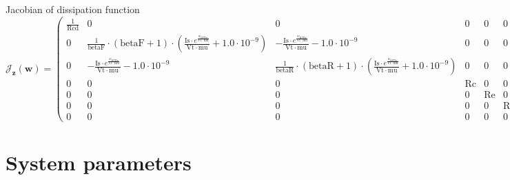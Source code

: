 \documentclass[11pt, oneside]{article}      %
\begin{document}
Jacobian of dissipation function $ \mathcal{J}_{\mathbf{z}}(\mathbf{w}) = \left(\begin{array}{ccccccc}\frac{1}{\mathrm{Rcd}} & 0 & 0 & 0 & 0 & 0 & 0\\0 & \frac{1}{\mathrm{betaF}} \cdot \left(\mathrm{betaF} + 1\right) \cdot \left(\frac{\mathrm{Is} \cdot e^{\frac{w_{\mathrm{BJTbe}}}{\mathrm{Vt} \cdot \mathrm{mu}}}}{\mathrm{Vt} \cdot \mathrm{mu}} + 1.0 \cdot 10^{-9}\right) & - \frac{\mathrm{Is} \cdot e^{\frac{w_{\mathrm{BJTbc}}}{\mathrm{Vt} \cdot \mathrm{mu}}}}{\mathrm{Vt} \cdot \mathrm{mu}} - 1.0 \cdot 10^{-9} & 0 & 0 & 0 & 0\\0 & - \frac{\mathrm{Is} \cdot e^{\frac{w_{\mathrm{BJTbe}}}{\mathrm{Vt} \cdot \mathrm{mu}}}}{\mathrm{Vt} \cdot \mathrm{mu}} - 1.0 \cdot 10^{-9} & \frac{1}{\mathrm{betaR}} \cdot \left(\mathrm{betaR} + 1\right) \cdot \left(\frac{\mathrm{Is} \cdot e^{\frac{w_{\mathrm{BJTbc}}}{\mathrm{Vt} \cdot \mathrm{mu}}}}{\mathrm{Vt} \cdot \mathrm{mu}} + 1.0 \cdot 10^{-9}\right) & 0 & 0 & 0 & 0\\0 & 0 & 0 & \mathrm{Rc} & 0 & 0 & 0\\0 & 0 & 0 & 0 & \mathrm{Re} & 0 & 0\\0 & 0 & 0 & 0 & 0 & \mathrm{Rb} & 0\\0 & 0 & 0 & 0 & 0 & 0 & \mathrm{Rcd}\end{array}\right) ; $ 
%
\\
%
%
\section{System parameters}
%
%
\end{document}
